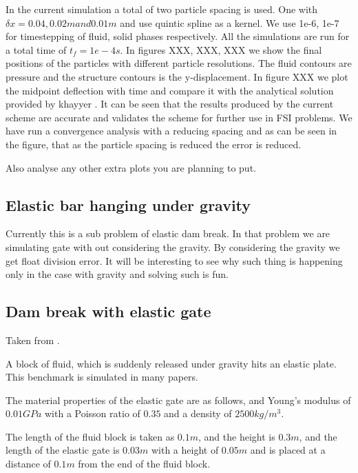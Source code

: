 \documentclass[preprint,12pt]{elsarticle}
\begin{document}
In the current simulation a total of two particle spacing is used. One with
$\delta x = 0.04 , 0.02m and 0.01 m$ and use quintic spline as a kernel. We
use 1e-6, 1e-7 for timestepping of fluid, solid phases respectively. All the
simulations are run for a total time of $t_f = 1e-4s$. In figures XXX, XXX,
XXX we show the final positions of the particles with different particle
resolutions. The fluid contours are pressure and the structure contours is the
y-displacement. In figure XXX we plot the midpoint deflection with time and
compare it with the analytical solution provided by khayyer . It can be seen
that the results produced by the current scheme are accurate and validates the
scheme for further use in FSI problems. We have run a convergence analysis
with a reducing spacing and as can be seen in the figure, that as the particle
spacing is reduced the error is reduced.

Also analyse any other extra plots you are planning to put.




\subsection{Elastic bar hanging under gravity}
\label{sec:elastic-bar-hanging}


Currently this is a sub problem of elastic dam break. In that problem we are
simulating gate with out considering the gravity. By considering the gravity
we get float division error. It will be interesting to see why such thing is
happening only in the case with gravity and solving such is fun.


\subsection{Dam break with elastic gate}
\label{sec:dam-break-elastic-gate}

Taken from \citet{sun2019fully}.

A block of fluid, which is suddenly released under gravity hits an elastic
plate. This benchmark is simulated in many papers.

The material properties of the elastic gate are as follows, and Young's
modulus of $0.01 GPa$ with a Poisson ratio of $0.35$ and a density of
$2500 kg/m^3$.

The length of the fluid block is taken as $0.1m$, and the height is $0.3m$,
and the length of the elastic gate is $0.03m$ with a height of $0.05m$ and is
placed at a distance of $0.1m$ from the end of the fluid block.
\end{document}
